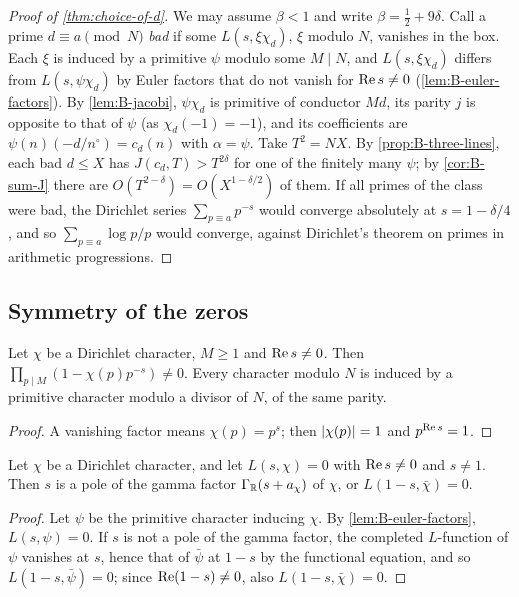 \begin{proof}[Proof of \cref{thm:choice-of-d}]
We may assume $\beta<1$ and write $\beta=\frac12+9\delta$. Call a prime $d\equiv a\pmod N$ \emph{bad} if
some $L(s,\xi\chi_d)$, $\xi$ modulo $N$, vanishes in the box. Each $\xi$ is induced by a primitive
$\psi$ modulo some $M\mid N$, and $L(s,\xi\chi_d)$ differs from $L(s,\psi\chi_d)$ by Euler factors that
do not vanish for $\operatorname{Re} s\ne0$ (\cref{lem:B-euler-factors}). By \cref{lem:B-jacobi}, $\psi\chi_d$ is
primitive of conductor $Md$, its parity $j$ is opposite to that of $\psi$ (as $\chi_d(-1)=-1$), and its
coefficients are $\psi(n)(-d/n^\circ)=c_d(n)$ with $\alpha=\psi$. Take $T^2=NX$. By
\cref{prop:B-three-lines}, each bad $d\le X$ has $J(c_d,T)>T^{2\delta}$ for one of the finitely many
$\psi$; by \cref{cor:B-sum-J} there are $O(T^{2-\delta})=O(X^{1-\delta/2})$ of them. If all primes of
the class were bad, the Dirichlet series $\sum_{p\equiv a}p^{-s}$ would converge absolutely at
$s=1-\delta/4$, and so $\sum_{p\equiv a}\log p/p$ would converge, against Dirichlet's theorem on primes
in arithmetic progressions.
\end{proof}

\subsection{Symmetry of the zeros}\label{ss:B-zero-symmetry}

\begin{lemma}\label{lem:B-euler-factors}
Let $\chi$ be a Dirichlet character, $M\ge1$ and $\operatorname{Re} s\neq0$. Then
$\prod_{p\mid M}(1-\chi(p)p^{-s})\neq0$. Every character modulo $N$ is induced by a primitive character
modulo a divisor of $N$, of the same parity.
\end{lemma}

\begin{proof}
A vanishing factor means $\chi(p)=p^s$; then $\lvert \chi(p)\rvert=1$ and $p^{\operatorname{Re} s}=1$.
\end{proof}

\begin{proposition}\label{prop:B-zero-symmetry}
Let $\chi$ be a Dirichlet character, and let $L(s,\chi)=0$ with $\operatorname{Re} s\ne0$ and $s\ne1$. Then $s$ is a
pole of the gamma factor $\Gamma_{\mathbb{R}}(s+a_\chi)$ of $\chi$, or $L(1-s,\bar\chi)=0$.
\end{proposition}

\begin{proof}
Let $\psi$ be the primitive character inducing $\chi$. By \cref{lem:B-euler-factors}, $L(s,\psi)=0$. If
$s$ is not a pole of the gamma factor, the completed $L$-function of $\psi$ vanishes at $s$, hence that
of $\bar\psi$ at $1-s$ by the functional equation, and so $L(1-s,\bar\psi)=0$; since $\operatorname{Re}(1-s)\neq0$,
also $L(1-s,\bar\chi)=0$.
\end{proof}
